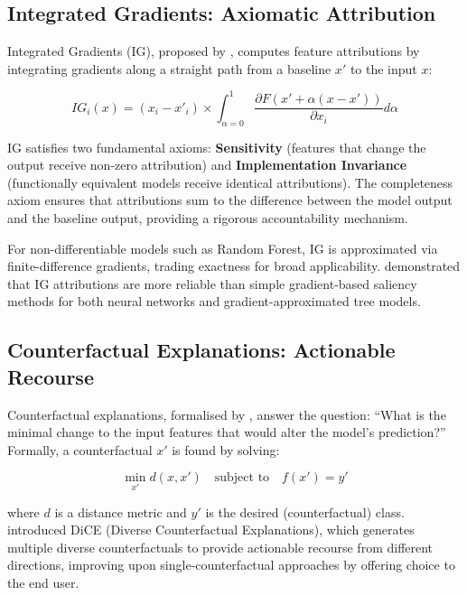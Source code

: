 \documentclass[journal]{IEEEtran}
\newcommand{\citet}[1]{\cite{#1}}
\begin{document}
\subsection{Integrated Gradients: Axiomatic Attribution}

Integrated Gradients (IG), proposed by \citet{sundararajan2017axiomatic}, computes feature attributions by integrating gradients along a straight path from a baseline $x'$ to the input $x$:

\begin{equation}
IG_i(x) = (x_i - x'_i) \times \int_{\alpha=0}^{1} \frac{\partial F(x' + \alpha(x - x'))}{\partial x_i} d\alpha
\end{equation}

IG satisfies two fundamental axioms: \textbf{Sensitivity} (features that change the output receive non-zero attribution) and \textbf{Implementation Invariance} (functionally equivalent models receive identical attributions). The completeness axiom ensures that attributions sum to the difference between the model output and the baseline output, providing a rigorous accountability mechanism.

For non-differentiable models such as Random Forest, IG is approximated via finite-difference gradients, trading exactness for broad applicability. \citet{samek2019explainable} demonstrated that IG attributions are more reliable than simple gradient-based saliency methods for both neural networks and gradient-approximated tree models.

\subsection{Counterfactual Explanations: Actionable Recourse}

Counterfactual explanations, formalised by \citet{wachter2017counterfactual}, answer the question: ``What is the minimal change to the input features that would alter the model's prediction?'' Formally, a counterfactual $x'$ is found by solving:

\begin{equation}
\min_{x'} d(x, x') \quad \text{subject to} \quad f(x') = y'
\end{equation}

where $d$ is a distance metric and $y'$ is the desired (counterfactual) class. \citet{mothilal2020explaining} introduced DiCE (Diverse Counterfactual Explanations), which generates multiple diverse counterfactuals to provide actionable recourse from different directions, improving upon single-counterfactual approaches by offering choice to the end user.
\end{document}
